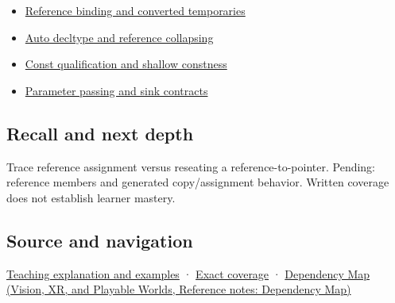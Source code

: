 \hypertarget{appendix-d6d562ca9fbb-used-by}{}

\begin{itemize}
\tightlist
\item
  \hyperref[appendix-37856d997bb0]{Reference binding and converted temporaries}
\item
  \hyperref[appendix-5d4252a42886]{Auto decltype and reference collapsing}
\item
  \hyperref[appendix-c25d60fed375]{Const qualification and shallow constness}
\item
  \hyperref[appendix-d5908f75721f]{Parameter passing and sink contracts}
\end{itemize}

\subsection{Recall and next depth}\label{appendix-d6d562ca9fbb-recall-and-next-depth}

\hypertarget{appendix-d6d562ca9fbb-recall-and-next-depth}{}

Trace reference assignment versus reseating a reference-to-pointer. Pending: reference members and generated copy/assignment behavior. Written coverage does not establish learner mastery.

\subsection{Source and navigation}\label{appendix-d6d562ca9fbb-source-and-navigation}

\hypertarget{appendix-d6d562ca9fbb-source-and-navigation}{}

\hyperref[01-foundations-i-ch003-giving-another-name-to-a-live-object]{Teaching explanation and examples} · \hyperref[appendix-fd090d982a15-m008---parts-113-126]{Exact coverage} · \href{../07-Vision-XR-and-Playable-Worlds/main.pdf\#nameddest=appendix-4ad47bdd269a}{Dependency Map (Vision, XR, and Playable Worlds, Reference notes: Dependency Map)}
